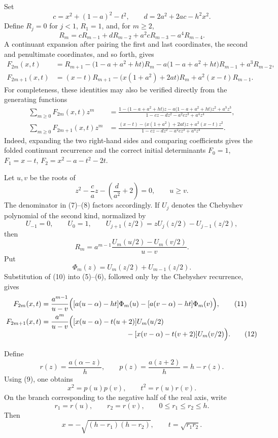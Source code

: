 \documentclass[11pt]{article}
\begin{document}
Set
\[
c=x^2+(1-a)^2-t^2,
\qquad
d=2a^2+2ac-h^2x^2.
\]
Define \(R_j=0\) for \(j<1\), \(R_1=1\), and, for \(m\geq2\),
\[
R_m
 =cR_{m-1}+dR_{m-2}+a^2cR_{m-3}-a^4R_{m-4}.
\tag{4}
\]
A continuant expansion after pairing the first and last coordinates, the
second and penultimate coordinates, and so forth, gives
\begin{align}
F_{2m}(x,t)
 &=R_{m+1}-\bigl(1-a+a^2+ht\bigr)R_m
   -a\bigl(1-a+a^2+ht\bigr)R_{m-1}+a^3R_{m-2},
\tag{5}\\
F_{2m+1}(x,t)
 &=(x-t)R_{m+1}
   -\bigl(x(1+a^2)+2at\bigr)R_m
   +a^2(x-t)R_{m-1}.
\tag{6}
\end{align}
For completeness, these identities may also be verified directly from the
generating functions
\begin{align}
\sum_{m\geq0}F_{2m}(x,t)z^m
 &=
 \frac{1-\bigl(1-a+a^2+ht\bigr)z
       -a\bigl(1-a+a^2+ht\bigr)z^2+a^3z^3}
 {1-cz-dz^2-a^2cz^3+a^4z^4},
\tag{7}\\
\sum_{m\geq0}F_{2m+1}(x,t)z^m
 &=
 \frac{(x-t)-\bigl(x(1+a^2)+2at\bigr)z+a^2(x-t)z^2}
 {1-cz-dz^2-a^2cz^3+a^4z^4}.
\tag{8}
\end{align}
Indeed, expanding the two right-hand sides and comparing coefficients gives
the folded continuant recurrence and the correct initial determinants
\(F_0=1\), \(F_1=x-t\), \(F_2=x^2-a-t^2-2t\).

Let \(u,v\) be the roots of
\[
z^2-\frac ca z-\left(\frac d{a^2}+2\right)=0,
\qquad u\geq v.
\tag{9}
\]
The denominator in (7)--(8) factors accordingly. If \(U_j\) denotes the
Chebyshev polynomial of the second kind, normalized by
\[
U_{-1}=0,\qquad U_0=1,\qquad
U_{j+1}(z/2)=zU_j(z/2)-U_{j-1}(z/2),
\]
then
\[
R_m
 =a^{m-1}
 \frac{U_m(u/2)-U_m(v/2)}{u-v}.
\tag{10}
\]
Put
\[
\Phi_m(z)=U_m(z/2)+U_{m-1}(z/2).
\]
Substitution of (10) into (5)--(6), followed only by the Chebyshev recurrence,
gives
\begin{align}
F_{2m}(x,t)
 &=
 \frac{a^{m-1}}{u-v}
 \Bigl(
  [a(u-\alpha)-ht]\Phi_m(u)
  -[a(v-\alpha)-ht]\Phi_m(v)
 \Bigr),
\tag{11}\\
F_{2m+1}(x,t)
 &=
 \frac{a^m}{u-v}
 \Bigl(
  [x(u-\alpha)-t(u+2)]U_m(u/2)
 \notag\\[-2mm]
 &\hspace{42mm}
  -[x(v-\alpha)-t(v+2)]U_m(v/2)
 \Bigr).
\tag{12}
\end{align}

Define
\[
r(z)=\frac{a(\alpha-z)}h,
\qquad
p(z)=\frac{a(z+2)}h=h-r(z).
\tag{13}
\]
Using (9), one obtains
\[
x^2=p(u)p(v),
\qquad
t^2=r(u)r(v).
\tag{14}
\]
On the branch corresponding to the negative half of the real axis, write
\[
r_1=r(u),\qquad r_2=r(v),
\qquad 0\leq r_1\leq r_2\leq h.
\]
Then
\[
x=-\sqrt{(h-r_1)(h-r_2)},
\qquad
t=\sqrt{r_1r_2}.
\tag{15}
\]
\end{document}
